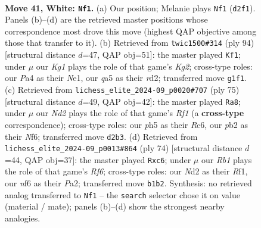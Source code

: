 \documentclass[11pt]{article}
\begin{document}
\clearpage

\begin{figure}[p]\centering
\begin{subfigure}{0.46\textwidth}\centering
\resizebox{\linewidth}{!}{%
\newchessgame
\chessboard[
  setfen={5k2/1b3p2/5np1/q6p/P7/6P1/1p1NRP1P/1R4K1 w - - 2 41},
  showmover=false,
  pgfstyle=straightmove, color=movearrow, markmove={d2-f1}
]}
\caption{}
\end{subfigure}\hfill
\begin{subfigure}{0.46\textwidth}\centering
\resizebox{\linewidth}{!}{%
\newchessgame
\chessboard[
  setfen={8/5kp1/4n2p/5p2/4p2P/4R1P1/3r1PK1/4N3 w - - 9 48},
  showmover=false,
  pgfstyle=straightmove, color=movearrow, markmove={g2-f1}
]}
\caption{}
\end{subfigure}
\\[4pt]
\begin{subfigure}{0.46\textwidth}\centering
\resizebox{\linewidth}{!}{%
\newchessgame
\chessboard[
  setfen={5r2/4Rpk1/2r2np1/P6p/3Q4/7P/5PP1/6K1 b - - 0 38},
  showmover=false,
  pgfstyle=straightmove, color=movearrow, markmove={f8-a8}
]}
\caption{}
\end{subfigure}\hfill
\begin{subfigure}{0.46\textwidth}\centering
\resizebox{\linewidth}{!}{%
\newchessgame
\chessboard[
  setfen={8/p6p/2p2Rpk/8/2Pq4/1P5P/P5P1/5R1K w - - 0 38},
  showmover=false,
  pgfstyle=straightmove, color=movearrow, markmove={f6-c6}
]}
\caption{}
\end{subfigure}
\caption{\textbf{Move 41, White: \texttt{Nf1}.} (a) Our position; Melanie plays \texttt{Nf1} (\texttt{d2f1}). Panels (b)--(d) are the retrieved master positions whose correspondence most drove this move (highest QAP objective among those that transfer to it). (b) Retrieved from \texttt{twic1500\#314} (ply 94) [structural distance $d$=47, QAP obj=51]: the master played \texttt{Kf1}; under $\mu$ our \emph{Kg1} plays the role of that game's \emph{Kg2}; cross-type roles: our \emph{P}a4 as their \emph{N}e1, our \emph{q}a5 as their \emph{r}d2; transferred move \texttt{g1f1}. (c) Retrieved from \texttt{lichess\_elite\_2024-09\_p0020\#707} (ply 75) [structural distance $d$=49, QAP obj=42]: the master played \texttt{Ra8}; under $\mu$ our \emph{Nd2} plays the role of that game's \emph{Rf1} (a \textbf{cross-type} correspondence); cross-type roles: our \emph{p}h5 as their \emph{R}c6, our \emph{p}b2 as their \emph{N}f6; transferred move \texttt{d2b3}. (d) Retrieved from \texttt{lichess\_elite\_2024-09\_p0013\#864} (ply 74) [structural distance $d$=44, QAP obj=37]: the master played \texttt{Rxc6}; under $\mu$ our \emph{Rb1} plays the role of that game's \emph{Rf6}; cross-type roles: our \emph{N}d2 as their \emph{R}f1, our \emph{n}f6 as their \emph{P}a2; transferred move \texttt{b1b2}. Synthesis: no retrieved analog transferred to \texttt{Nf1} -- the \texttt{search} selector chose it on value (material / mate); panels (b)--(d) show the strongest nearby analogies.}
\label{fig:thought-m80}
\end{figure}
\end{document}
